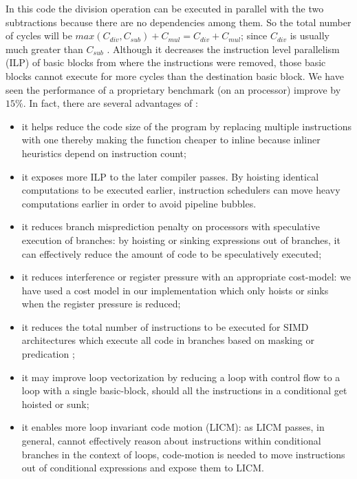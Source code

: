 \documentclass[sigplan,10pt,review,anonymous]{acmart}\settopmatter{printfolios=true,printccs=false,printacmref=false}
\begin{document}
In this code the division operation can be executed in parallel with the two
subtractions because there are no dependencies among them. So the total number
of cycles will be $max(C_{div}, C_{sub}) + C_{mul} = C_{div} + C_{mul}$; since
$C_{div}$ is usually much greater than $C_{sub}$ \cite{x86,aarch64}.  Although
it decreases the instruction level parallelism (ILP) of basic blocks from where
the instructions were removed, those basic blocks cannot execute for more cycles
than the destination basic block. We have seen the performance of a proprietary
benchmark (on an \ooo{} processor) improve by $15\%$.  In fact, there are
several advantages of \GCM{}:
\begin{itemize}[leftmargin=*,topsep=0pt]
\item it helps reduce the code size of the program by replacing multiple
  instructions with one thereby making the function cheaper to inline because
  inliner heuristics depend on instruction count;
\item it exposes more ILP to the later compiler passes. By hoisting identical
  computations to be executed earlier, instruction schedulers can move heavy
  computations earlier in order to avoid pipeline bubbles.
\item it reduces branch misprediction penalty on \ooo{} processors with
  speculative execution of branches: by hoisting or sinking expressions out of
  branches, it can effectively reduce the amount of code to be speculatively
  executed;
\item it reduces interference or register pressure with an appropriate
  cost-model: we have used a cost model in our implementation which only hoists
  or sinks when the register pressure is reduced;
\item it reduces the total number of instructions to be executed for SIMD
  architectures which execute all code in branches based on masking or
  predication \cite{simd};
\item it may improve loop vectorization by reducing a loop with control flow to
  a loop with a single basic-block, should all the instructions in a conditional get
  hoisted or sunk;
\item it enables more loop invariant code motion (LICM): as LICM passes, in
  general, cannot effectively reason about instructions within conditional
  branches in the context of loops, code-motion is needed to move instructions
  out of conditional expressions and expose them to LICM.
\end{itemize}
\end{document}
